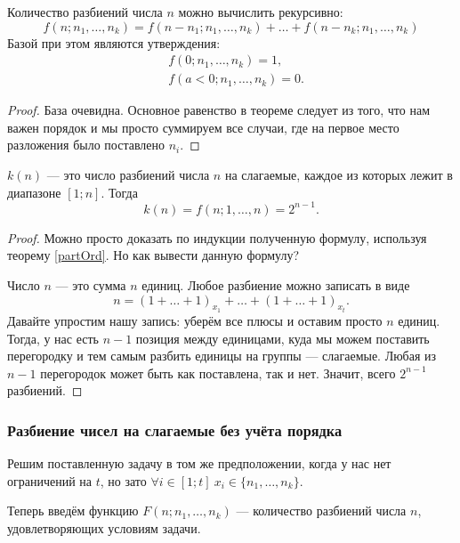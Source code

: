 \begin{theorem} \label{partOrd}
	Количество разбиений числа $n$ можно вычислить рекурсивно:
	\[
		f(n; n_1, \ldots, n_k) = f(n - n_1; n_1, \ldots, n_k) + \ldots + f(n - n_k; n_1, \ldots, n_k)
	\]
	Базой при этом являются утверждения:
	\begin{align*}
		&f(0; n_1, \ldots, n_k) = 1,
		\\
		&f(a < 0; n_1, \ldots, n_k) = 0.
	\end{align*}
\end{theorem}

\begin{proof}
	База очевидна. Основное равенство в теореме следует из того, что нам важен порядок и мы просто суммируем все случаи, где на первое место разложения было поставлено $n_i$.
\end{proof}

\begin{corollary}
	$k(n)$ --- это число разбиений числа $n$ на слагаемые, каждое из которых лежит в диапазоне $[1; n]$. Тогда
	\[
		k(n) = f(n; 1, \ldots, n) = 2^{n - 1}.
	\]
\end{corollary}

\begin{proof}
	Можно просто доказать по индукции полученную формулу, используя теорему \ref{partOrd}. Но как вывести данную формулу?
	
	Число $n$ --- это сумма $n$ единиц. Любое разбиение можно записать в виде
	\[
		n = (1 + \ldots + 1)_{x_1} + \ldots + (1 + \ldots + 1)_{x_t}.
	\]
	Давайте упростим нашу запись: уберём все плюсы и оставим просто $n$ единиц. Тогда, у нас есть $n - 1$ позиция между единицами, куда мы можем поставить перегородку и тем самым разбить единицы на группы --- слагаемые. Любая из $n - 1$ перегородок может быть как поставлена, так и нет. Значит, всего $2^{n - 1}$ разбиений.
\end{proof}

\subsubsection*{Разбиение чисел на слагаемые без учёта порядка}

Решим поставленную задачу в том же предположении, когда у нас нет ограничений на $t$, но зато $\forall i \in [1; t]\ x_i \in \{n_1, \ldots, n_k\}$.

Теперь введём функцию $F(n; n_1, \ldots, n_k)$ --- количество разбиений числа $n$, удовлетворяющих условиям задачи.

